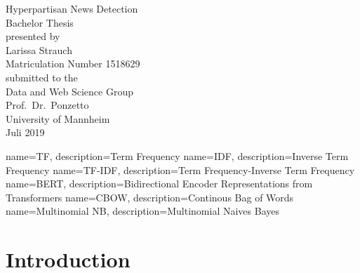 \documentclass[a4paper, 11pt,titlepage,oneside,openany]{book}
\begin{document}
\begin{titlepage}
	\vspace*{2cm}
  \begin{center}
   {\Large Hyperpartisan News Detection\\}
   \vspace{2cm} 
   {Bachelor Thesis\\}
   \vspace{2cm}
   {presented by\\
    Larissa Strauch \\
    Matriculation Number 1518629\\
   }
   \vspace{1cm} 
   {submitted to the\\
    Data and Web Science Group\\
    Prof.\ Dr.\ Ponzetto\\
    University of Mannheim\\} \vspace{2cm}
   {Juli 2019}
  \end{center}
\end{titlepage} 

\tableofcontents
\newpage

\listofalgorithms
\listoffigures

\listoftables

{
	name=TF,
	description={Term Frequency}
}
{
	name=IDF,
	description={Inverse Term Frequency}
}
{
	name=TF-IDF,
	description={Term Frequency-Inverse Term Frequency}
}
{
	name=BERT,
	description={Bidirectional Encoder Representations from Transformers}
}
{
	name=CBOW,
	description={Continous Bag of Words}
}
{
	name=Multinomial NB,
	description={Multinomial Naives Bayes}
}


\printglossaries %


\newpage



\chapter{Introduction}
\end{document}
